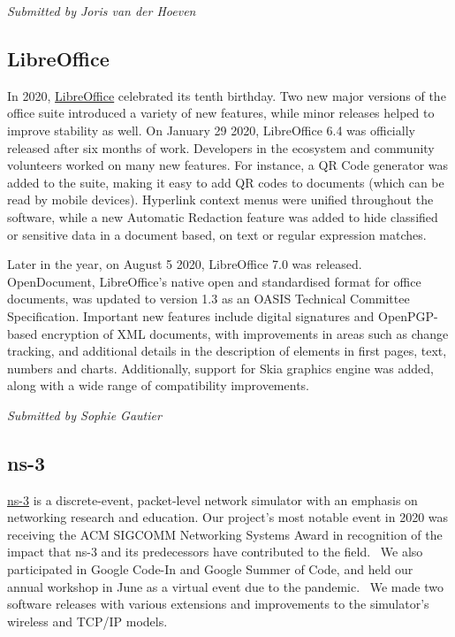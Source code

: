 \documentclass[a4paper]{report}
\begin{document}
{\em Submitted by Joris van der Hoeven}

\subsection{LibreOffice}

In 2020, \href{https://www.libreoffice.org/}{LibreOffice} celebrated its tenth birthday. Two new major versions of the office suite introduced a variety of new features, while minor releases helped to improve stability as well. On January 29 2020, LibreOffice 6.4 was officially released after six months of work. Developers in the ecosystem and community volunteers worked on many new features. For instance, a QR Code generator was added to the suite, making it easy to add QR codes to documents (which can be read by mobile devices).  Hyperlink context menus were unified throughout the software, while a new Automatic Redaction feature was added to hide classified or sensitive data in a document based, on text or regular expression matches.

Later in the year, on August 5 2020, LibreOffice 7.0 was released.  OpenDocument, LibreOffice's native open and standardised format for office documents, was updated to version 1.3 as an OASIS Technical Committee Specification. Important new features include digital signatures and OpenPGP-based encryption of XML documents, with improvements in areas such as change tracking, and additional details in the description of elements in first pages, text, numbers and charts.  Additionally, support for Skia graphics engine was added, along with a wide range of compatibility improvements.

{\em Submitted by Sophie Gautier}

\subsection{ns-3}

\href{https://www.nsnam.org/}{ns-3} is a discrete-event, packet-level network simulator with an emphasis on networking research and education.  Our project's most notable event in 2020 was receiving the ACM SIGCOMM Networking Systems Award in recognition of the impact that ns-3 and its predecessors have contributed to the field.  We also participated in Google Code-In and Google Summer of Code, and held our annual workshop in June as a virtual event due to the pandemic.  We made two software releases with various extensions and improvements to the simulator's wireless and TCP/IP models.
\end{document}
